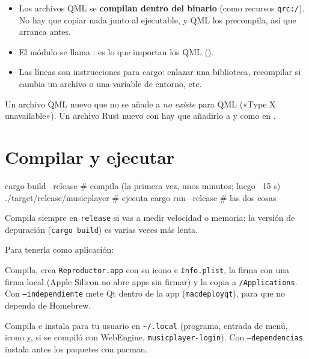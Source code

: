 \begin{itemize}
  \item Los archivos QML se \textbf{compilan dentro del binario} (como recursos
  \texttt{qrc:/}). No hay que copiar nada junto al ejecutable, y QML los precompila, así que
  arranca antes.
  \item El módulo se llama : es lo que importan los QML
  ().
  \item Las líneas  son instrucciones para cargo: enlazar una
  biblioteca, recompilar si cambia un archivo o una variable de entorno, etc.
\end{itemize}

\begin{trampa}
Un archivo QML nuevo que no se añade a  \emph{no existe} para QML («Type X
unavailable»). Un archivo Rust nuevo con  hay que añadirlo a
 y como  en .
\end{trampa}

\section{Compilar y ejecutar}

\begin{terminal}
cargo build --release          # compila (la primera vez, unos minutos; luego ~15 s)
./target/release/musicplayer   # ejecuta
cargo run --release            # las dos cosas
\end{terminal}

Compila siempre en \texttt{release} si vas a medir velocidad o memoria: la versión de
depuración (\texttt{cargo build}) es varias veces más lenta.

Para tenerla como aplicación:

\begin{description}[leftmargin=1.2em]
  \item[macOS: \archivo{scripts/crear-app-macos.sh}] Compila, crea \texttt{Reproductor.app}
  con su icono e \texttt{Info.plist}, la firma con una firma local (Apple Silicon no abre apps
  sin firmar) y la copia a \texttt{/Applications}. Con \texttt{--independiente} mete Qt dentro
  de la app (\texttt{macdeployqt}), para que no dependa de Homebrew.
  \item[Linux: \archivo{scripts/instalar-linux.sh}] Compila e instala para tu usuario en
  \texttt{\textasciitilde/.local} (programa, entrada de menú, icono y, si se compiló con
  WebEngine, \texttt{musicplayer-login}). Con \texttt{--dependencias} instala antes los paquetes
  con pacman.
\end{description}

